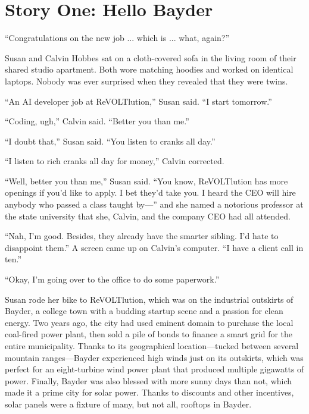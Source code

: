 \newcommand{\protag}{Susan}
\newcommand{\sidetag}{Calvin}
\newcommand{\lastname}{Hobbes}

\chapter{Story One: Hello Bayder}


``Congratulations on the new job ... which is ... what, again?''

{\protag} and {\sidetag} {\lastname} sat on a cloth-covered sofa in the living room of their shared studio apartment. Both wore matching hoodies and worked on identical laptops. Nobody was ever surprised when they revealed that they were twins.

``An AI developer job at ReVOLTlution,'' {\protag} said. ``I start tomorrow.''

``Coding, ugh,” {\sidetag} said. ``Better you than me.''

``I doubt that,'' {\protag} said. ``You listen to cranks all day.''

``I listen to rich cranks all day for money,'' {\sidetag} corrected.

``Well, better you than me,'' {\protag} said. ``You know, ReVOLTlution has more openings if you’d like to apply. I bet they’d take you. I heard the CEO will hire anybody who passed a class taught by---'' and she named a notorious professor at the state university that she, {\sidetag}, and the company CEO had all attended.

``Nah, I'm good. Besides, they already have the smarter sibling. I'd hate to disappoint them.'' A screen came up on {\sidetag}’s computer. ``I have a client call in ten.''

``Okay, I’m going over to the office to do some paperwork.''

{\protag} rode her bike to ReVOLTlution, which was on the industrial outskirts of Bayder, a college town with a budding startup scene and a passion for clean energy. Two years ago, the city had used eminent domain to purchase the local coal-fired power plant, then sold a pile of bonds to finance a smart grid for the entire municipality. Thanks to its geographical location---tucked between several mountain ranges---Bayder experienced high winds just on its outskirts, which was perfect for an eight-turbine wind power plant that produced multiple gigawatts of power. Finally, Bayder was also blessed with more sunny days than not, which made it a prime city for solar power. Thanks to discounts and other incentives, solar panels were a fixture of many, but not all, rooftops in Bayder.

